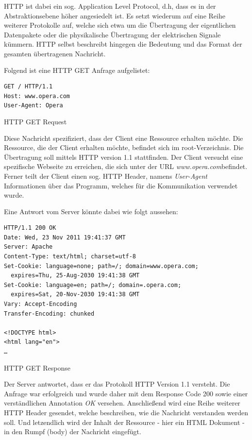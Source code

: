 HTTP ist dabei ein sog. Application Level Protocol, d.h, dass es in der Abstraktionsebene höher angesiedelt ist. Es setzt wiederum auf eine Reihe weiterer Protokolle auf, welche sich etwa um die Übertragung der eigentlichen Datenpakete oder die physikalische Übertragung der elektrischen Signale kümmern. HTTP selbst beschreibt hingegen die Bedeutung und das Format der gesamten übertragenen Nachricht.

Folgend ist eine HTTP GET Anfrage aufgelistet:

\begin{listing}[H]
\begin{verbatim}
GET / HTTP/1.1
Host: www.opera.com
User-Agent: Opera
\end{verbatim}
\caption{HTTP GET Request}
\end{listing}

Diese Nachricht spezifiziert, dass der Client eine Ressource erhalten möchte.
Die Ressource, die der Client erhalten möchte, befindet sich im root-Verzeichnis.
Die Übertragung soll mittels HTTP version 1.1 stattfinden. Der Client versucht eine spezifische Webseite zu erreichen, die sich unter der URL \emph{www.opera.com}befindet. Ferner teilt der Client einen sog. HTTP Header, namens \emph{User-Agent} Informationen über das Programm, welches für die Kommunikation verwendet wurde.

Eine Antwort vom Server könnte dabei wie folgt aussehen:

\begin{listing}[H]
\begin{verbatim}
HTTP/1.1 200 OK
Date: Wed, 23 Nov 2011 19:41:37 GMT
Server: Apache
Content-Type: text/html; charset=utf-8
Set-Cookie: language=none; path=/; domain=www.opera.com;
  expires=Thu, 25-Aug-2030 19:41:38 GMT
Set-Cookie: language=en; path=/; domain=.opera.com;
  expires=Sat, 20-Nov-2030 19:41:38 GMT
Vary: Accept-Encoding
Transfer-Encoding: chunked

<!DOCTYPE html>
<html lang="en">
…
\end{verbatim}
\caption{HTTP GET Response}
\end{listing}

Der Server antwortet, dass er das Protokoll HTTP Version 1.1 versteht. Die Anfrage war erfolgreich und wurde daher mit dem Response Code 200 sowie einer verständlichen Annotation \textit{OK} versehen. Anschließend wird eine Reihe weiterer HTTP Header gesendet, welche beschreiben, wie die Nachricht verstanden werden soll. Und letzendlich wird der Inhalt der Ressource - hier ein HTML Dokument - in den Rumpf (body) der Nachricht eingefügt.

